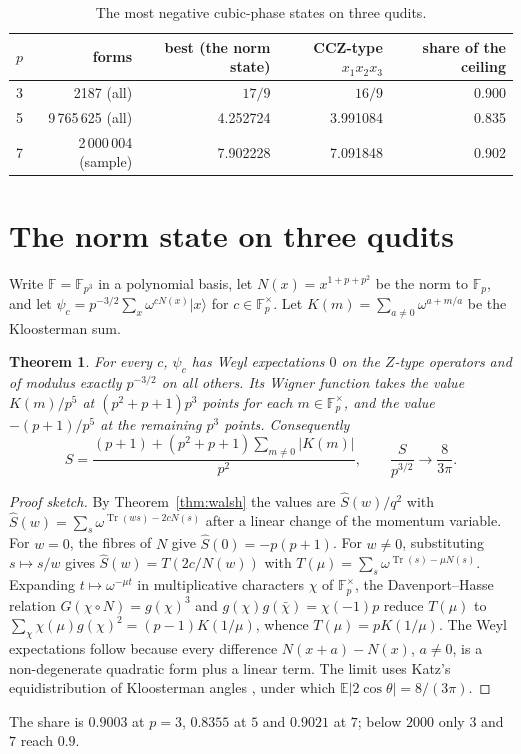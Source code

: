 \documentclass[11pt]{article}
\newtheorem{theorem}{Theorem}
\theoremstyle{remark}
\newcommand{\F}{\mathbb{F}}
\newcommand{\Tr}{\operatorname{Tr}}
\begin{document}
\begin{table}[h]\centering
\begin{tabular}{rrrrr}\toprule
$p$ & forms & best (the norm state) & CCZ-type $x_1x_2x_3$ & share of the ceiling\\\midrule
3 & 2187 (all) & $17/9$ & $16/9$ & 0.900\\
5 & 9\,765\,625 (all) & 4.252724 & 3.991084 & 0.835\\
7 & 2\,000\,004 (sample) & 7.902228 & 7.091848 & 0.902\\\bottomrule
\end{tabular}
\caption{The most negative cubic-phase states on three qudits.}\label{tab:cubic}
\end{table}

\section{The norm state on three qudits}\label{sec:norm}
Write $\F=\F_{p^3}$ in a polynomial basis, let $N(x)=x^{1+p+p^2}$ be the norm to $\F_p$, and let
$\psi_c=p^{-3/2}\sum_x\omega^{cN(x)}|x\rangle$ for $c\in\F_p^\times$. Let $K(m)=\sum_{a\ne0}\omega^{a+m/a}$ be the
Kloosterman sum.
\begin{theorem}\label{thm:norm}
For every $c$, $\psi_c$ has Weyl expectations $0$ on the $Z$-type operators and of modulus exactly $p^{-3/2}$ on all
others. Its Wigner function takes the value $K(m)/p^5$ at $(p^2+p+1)p^3$ points for each $m\in\F_p^\times$, and the value
$-(p+1)/p^5$ at the remaining $p^3$ points. Consequently
\[
S=\frac{(p+1)+(p^2+p+1)\sum_{m\ne0}|K(m)|}{p^2},\qquad \frac{S}{p^{3/2}}\longrightarrow\frac{8}{3\pi}.
\]
\end{theorem}
\begin{proof}[Proof sketch]
By Theorem~\ref{thm:walsh} the values are $\widehat S(w)/q^2$ with $\widehat S(w)=\sum_s\omega^{\Tr(ws)-2cN(s)}$ after
a linear change of the momentum variable. For $w=0$, the fibres of $N$ give $\widehat S(0)=-p(p+1)$. For $w\ne0$,
substituting $s\mapsto s/w$ gives $\widehat S(w)=T(2c/N(w))$ with $T(\mu)=\sum_s\omega^{\Tr(s)-\mu N(s)}$. Expanding
$t\mapsto\omega^{-\mu t}$ in multiplicative characters $\chi$ of $\F_p^\times$, the Davenport--Hasse relation
$G(\chi\circ N)=g(\chi)^3$ \cite{DavenportHasse} and $g(\chi)g(\bar\chi)=\chi(-1)p$ reduce $T(\mu)$ to
$\sum_\chi\chi(\mu)g(\chi)^2=(p-1)K(1/\mu)$, whence $T(\mu)=pK(1/\mu)$. The Weyl expectations follow because every
difference $N(x+a)-N(x)$, $a\ne0$, is a non-degenerate quadratic form plus a linear term. The limit uses Katz's
equidistribution of Kloosterman angles \cite{Katz1988}, under which $\mathbb E|2\cos\theta|=8/(3\pi)$.
\end{proof}
The share is $0.9003$ at $p=3$, $0.8355$ at $5$ and $0.9021$ at $7$; below $2000$ only $3$ and $7$ reach $0.9$.
\end{document}
